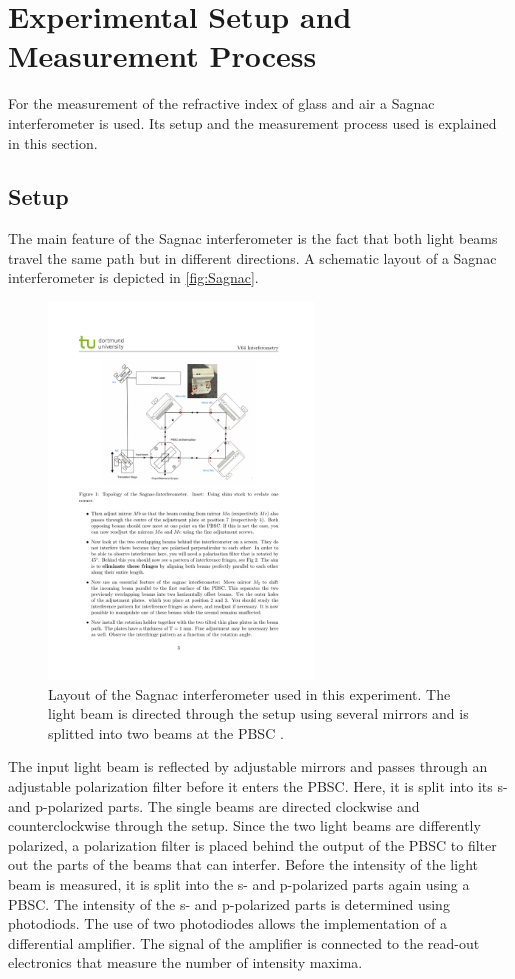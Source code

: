 \section{Experimental Setup and Measurement Process}
\label{sec:Experiment}
For the measurement of the refractive index of glass and air a Sagnac interferometer is used. Its setup and the measurement process used is explained in this section.
\subsection{Setup}
\label{sec:Setup}
The main feature of the Sagnac interferometer is the fact that both light beams travel the same path but in different directions. A schematic layout of a
Sagnac interferometer is depicted in \autoref{fig:Sagnac}.
\begin{figure}
    \centering
    \includegraphics[height=10cm]{content/pics/setup.pdf}
    \caption{Layout of the Sagnac interferometer used in this experiment. The light beam is directed through the setup using several mirrors and is splitted into
    two beams at the PBSC \cite{v64}.}
    \label{fig:Sagnac}
\end{figure}
The input light beam is reflected by adjustable mirrors and passes through an adjustable polarization filter before it enters the PBSC. Here, it is split into its s- and p-polarized parts. The single beams are directed clockwise
and counterclockwise through the setup. Since the two light beams are differently polarized, a polarization filter is placed behind the output of the PBSC to filter out the 
parts of the beams that can interfer.
Before the intensity of the light beam is measured, it is split into the s- and p-polarized parts again using a PBSC. The intensity of the s- and p-polarized parts 
is determined using photodiods. The use of two photodiodes allows the implementation of a differential amplifier. The signal of the amplifier is connected to 
the read-out electronics that measure the number of intensity maxima.

